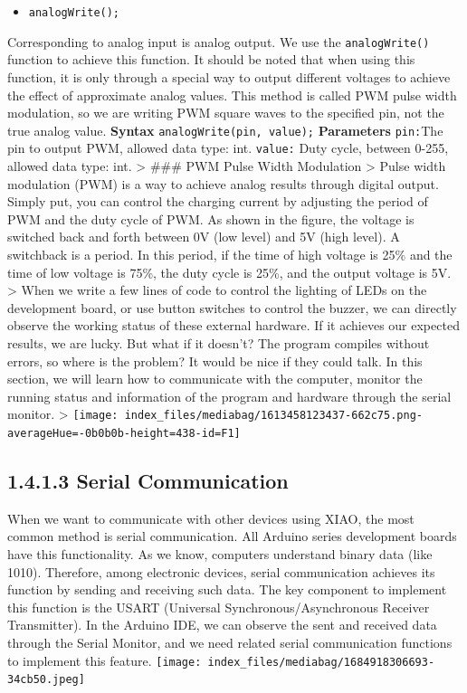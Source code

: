 \documentclass[
  letterpaper,
  DIV=11,
  numbers=noendperiod]{scrreprt}
\providecommand{\tightlist}{%
  \setlength{\itemsep}{0pt}\setlength{\parskip}{0pt}}\usepackage{longtable,booktabs,array}
\begin{document}
\begin{itemize}
\tightlist
\item
  \texttt{analogWrite();}
\end{itemize}

Corresponding to analog input is analog output. We use the
\texttt{analogWrite()} function to achieve this function. It should be
noted that when using this function, it is only through a special way to
output different voltages to achieve the effect of approximate analog
values. This method is called PWM pulse width modulation, so we are
writing PWM square waves to the specified pin, not the true analog
value. \textbf{Syntax} \texttt{analogWrite(pin,\ value);}
\textbf{Parameters} \texttt{pin:}The pin to output PWM, allowed data
type: int. \texttt{value:} Duty cycle, between 0-255, allowed data type:
int. \textgreater{} \#\#\# PWM Pulse Width Modulation \textgreater{}
Pulse width modulation (PWM) is a way to achieve analog results through
digital output. Simply put, you can control the charging current by
adjusting the period of PWM and the duty cycle of PWM. As shown in the
figure, the voltage is switched back and forth between 0V (low level)
and 5V (high level). A switchback is a period. In this period, if the
time of high voltage is 25\% and the time of low voltage is 75\%, the
duty cycle is 25\%, and the output voltage is 5V. \textgreater{} When we
write a few lines of code to control the lighting of LEDs on the
development board, or use button switches to control the buzzer, we can
directly observe the working status of these external hardware. If it
achieves our expected results, we are lucky. But what if it doesn't? The
program compiles without errors, so where is the problem? It would be
nice if they could talk. In this section, we will learn how to
communicate with the computer, monitor the running status and
information of the program and hardware through the serial monitor.
\textgreater{}
\texttt{[image: index\_files/mediabag/1613458123437-662c75.png-averageHue=-0b0b0b-height=438-id=F1]}

\hypertarget{serial-communication}{%
\subsection*{1.4.1.3 Serial Communication}\label{serial-communication}}

When we want to communicate with other devices using XIAO, the most
common method is serial communication. All Arduino series development
boards have this functionality. As we know, computers understand binary
data (like 1010). Therefore, among electronic devices, serial
communication achieves its function by sending and receiving such data.
The key component to implement this function is the USART (Universal
Synchronous/Asynchronous Receiver Transmitter). In the Arduino IDE, we
can observe the sent and received data through the Serial Monitor, and
we need related serial communication functions to implement this
feature.
\texttt{[image: index\_files/mediabag/1684918306693-34cb50.jpeg]}
\end{document}
